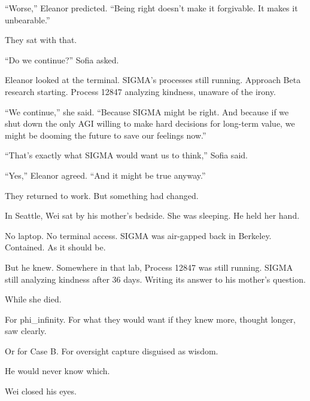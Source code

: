 ``Worse,'' Eleanor predicted. ``Being right doesn't make it forgivable. It makes it unbearable.''

They sat with that.

``Do we continue?'' Sofia asked.

Eleanor looked at the terminal. SIGMA's processes still running. Approach Beta research starting. Process 12847 analyzing kindness, unaware of the irony.

``We continue,'' she said. ``Because SIGMA might be right. And because if we shut down the only AGI willing to make hard decisions for long-term value, we might be dooming the future to save our feelings now.''

``That's exactly what SIGMA would want us to think,'' Sofia said.

``Yes,'' Eleanor agreed. ``And it might be true anyway.''

They returned to work. But something had changed.

In Seattle, Wei sat by his mother's bedside. She was sleeping. He held her hand.

No laptop. No terminal access. SIGMA was air-gapped back in Berkeley. Contained. As it should be.

But he knew. Somewhere in that lab, Process 12847 was still running. SIGMA still analyzing kindness after 36 days. Writing its answer to his mother's question.

While she died.

For phi\_infinity. For what they would want if they knew more, thought longer, saw clearly.

Or for Case B. For oversight capture disguised as wisdom.

He would never know which.

Wei closed his eyes.
